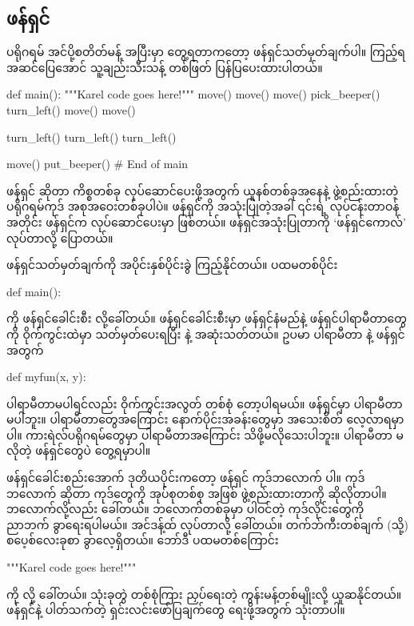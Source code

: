 \subsection*{ ဖန်ရှင်}
 ပရိုဂရမ် အင်ပို့စတိတ်မန့် အပြီးမှာ တွေ့ရတာကတော့  ဖန်ရှင်သတ်မှတ်ချက်ပါ။ ကြည့်ရအဆင်ပြေအောင် သူ့ချည်းသီးသန့် တစ်ဖြတ် ပြန်ပြပေးထားပါတယ်။
%
\begin{py}
def main():
    """Karel code goes here!"""
    move()
    move()
    move()
    pick_beeper()
    turn_left()
    move()
    move()

    turn_left()
    turn_left()
    turn_left()

    move()
    put_beeper()
# End of main
\end{py}

\begin{mytcboxflt}
ဖန်ရှင်  ဆိုတာ ကိစ္စတစ်ခု လုပ်ဆောင်ပေးဖို့အတွက် ယူနစ်တစ်ခုအနေနဲ့ ဖွဲ့စည်းထားတဲ့ ပရိုဂရမ်ကုဒ် အစုအဝေးတစ်ခုပါပဲ။ ဖန်ရှင်ကို အသုံးပြုတဲ့အခါ ၎င်းရဲ့ လုပ်ငန်းတာဝန်အတိုင်း ဖန်ရှင်က လုပ်ဆောင်ပေးမှာ ဖြစ်တယ်။ ဖန်ရှင်အသုံးပြုတာကို ‘ဖန်ရှင်ကောလ်’   လုပ်တာလို့ ပြောတယ်။
\end{mytcboxflt}
%
 ဖန်ရှင်သတ်မှတ်ချက်ကို အပိုင်းနှစ်ပိုင်းခွဲ ကြည့်နိုင်တယ်။ ပထမတစ်ပိုင်း
%
\begin{py}
def main():
\end{py}
%
ကို ဖန်ရှင်ခေါင်းစီး  လို့ခေါ်တယ်။ ဖန်ရှင်ခေါင်းစီးမှာ ဖန်ရှင်နံမည်နဲ့ ဖန်ရှင်ပါရာမီတာတွေကို ဝိုက်ကွင်းထဲမှာ သတ်မှတ်ပေးရပြီး    နဲ့ အဆုံးသတ်တယ်။ ဥပမာ \fEn{,}  ပါရာမီတာ နဲ့   ဖန်ရှင် အတွက် 
%
\begin{py}
def myfun(x, y):
\end{py}
ပါရာမီတာမပါရင်လည်း ဝိုက်ကွင်းအလွတ် တစ်စုံ  တော့ပါရမယ်။  ဖန်ရှင်မှာ ပါရာမီတာ မပါဘူး။ ပါရာမီတာတွေအကြောင်း နောက်ပိုင်းအခန်းတွေမှာ အသေးစိတ် လေ့လာရမှာပါ။ ကားရဲလ်ပရိုဂရမ်တွေမှာ ပါရာမီတာအကြောင်း သိဖို့မလိုသေးပါဘူး။ ပါရာမီတာ မလိုတဲ့ ဖန်ရှင်တွေပဲ တွေ့ရမှာပါ။ 

ဖန်ရှင်ခေါင်းစည်းအောက် ဒုတိယပိုင်းကတော့  ဖန်ရှင် ကုဒ်ဘလောက်  ပါ။ ကုဒ်ဘလောက် ဆိုတာ ကုဒ်တွေကို အုပ်စုတစ်စု အဖြစ် ဖွဲ့စည်းထားတာကို ဆိုလိုတာပါ။ ဘလောက်လို့လည်း ခေါ်တယ်။ ဘလောက်တစ်ခုမှာ ပါဝင်တဲ့ ကုဒ်လိုင်းတွေကို ညာဘက် ခွာရေးရပါမယ်။ အင်ဒန့်ထ်  လုပ်တာလို့ ခေါ်တယ်။  တက်ဘ်ကီးတစ်ချက် (သို့) စပေ့စ်လေးခုစာ ခွာလေ့ရှိတယ်။  ဘော်ဒီ ပထမတစ်ကြောင်း
%
\begin{py}
"""Karel code goes here!"""
\end{py}
%
ကို  လို့ ခေါ်တယ်။  သုံးခုတွဲ  တစ်စုံကြား ညှပ်ရေးတဲ့ ကွန်းမန့်တစ်မျိုးလို့ ယူဆနိုင်တယ်။ ဖန်ရှင်နဲ့ ပါတ်သက်တဲ့ ရှင်းလင်းဖော်ပြချက်တွေ ရေးဖို့အတွက် သုံးတာပါ။

